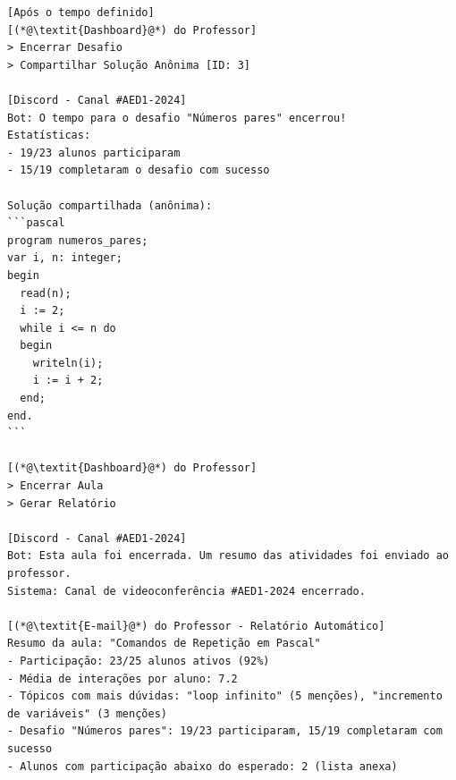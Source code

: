 \begin{lstlisting}
[Após o tempo definido]
[(*@\textit{Dashboard}@*) do Professor]
> Encerrar Desafio
> Compartilhar Solução Anônima [ID: 3]

[Discord - Canal #AED1-2024]
Bot: O tempo para o desafio "Números pares" encerrou!
Estatísticas:
- 19/23 alunos participaram
- 15/19 completaram o desafio com sucesso

Solução compartilhada (anônima):
```pascal
program numeros_pares;
var i, n: integer;
begin
  read(n);
  i := 2;
  while i <= n do
  begin
    writeln(i);
    i := i + 2;
  end;
end.
```

[(*@\textit{Dashboard}@*) do Professor]
> Encerrar Aula
> Gerar Relatório

[Discord - Canal #AED1-2024]
Bot: Esta aula foi encerrada. Um resumo das atividades foi enviado ao professor.
Sistema: Canal de videoconferência #AED1-2024 encerrado.

[(*@\textit{E-mail}@*) do Professor - Relatório Automático]
Resumo da aula: "Comandos de Repetição em Pascal"
- Participação: 23/25 alunos ativos (92%)
- Média de interações por aluno: 7.2
- Tópicos com mais dúvidas: "loop infinito" (5 menções), "incremento de variáveis" (3 menções)
- Desafio "Números pares": 19/23 participaram, 15/19 completaram com sucesso
- Alunos com participação abaixo do esperado: 2 (lista anexa)
\end{lstlisting}
